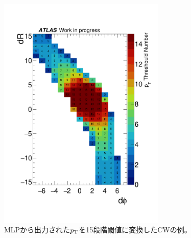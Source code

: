 \begin{figure}[tb]
  \centering
  \hspace*{-1cm}
  \includegraphics[clip, width=8cm]{fig/4/data_phi0_roi33_15thr.pdf}
  \caption{MLPから出力された$p_{\rm{T}}$を15段階閾値に変換したCWの例。}
    \label{CW}
\end{figure}